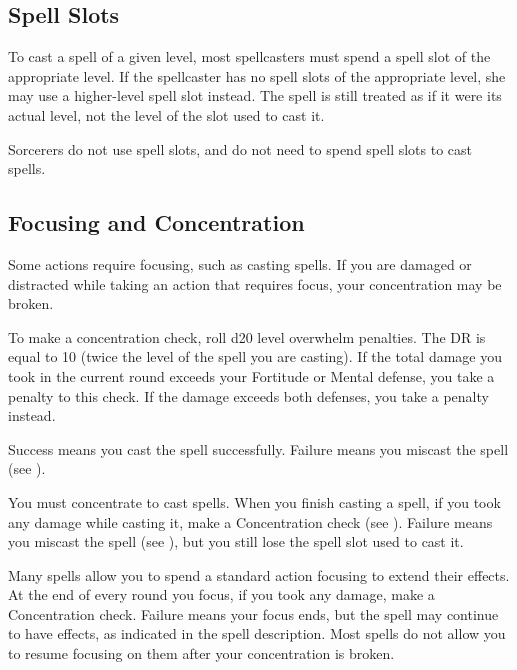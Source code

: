 \subsection{Spell Slots}
To cast a spell of a given level, most spellcasters must spend a spell slot of the appropriate level. If the spellcaster has no spell slots of the appropriate level, she may use a higher-level spell slot instead. The spell is still treated as if it were its actual level, not the level of the slot used to cast it.

Sorcerers do not use spell slots, and do not need to spend spell slots to cast spells.

\subsection{Focusing and Concentration}\label{Concentration}\label{Focus}\label{Focusing and Concentration}

Some actions require focusing, such as casting spells.
If you are damaged or distracted while taking an action that requires focus, your concentration may be broken.

\label{Concentration Checks}

To make a concentration check, roll d20 \add level \minus overwhelm penalties.
The DR is equal to 10 \add (twice the level of the spell you are casting).
If the total damage you took in the current round exceeds your Fortitude or Mental defense, you take a  penalty to this check.
If the damage exceeds both defenses, you take a  penalty instead.

Success means you cast the spell successfully.
Failure means you miscast the spell (see ).

 You must concentrate to cast spells. When you finish casting a spell, if you took any damage while casting it, make a Concentration check (see ). Failure means you miscast the spell (see ), but you still lose the spell slot used to cast it.

 Many spells allow you to spend a standard action focusing to extend their effects. At the end of every round you focus, if you took any damage, make a Concentration check. Failure means your focus ends, but the spell may continue to have effects, as indicated in the spell description. Most spells do not allow you to resume focusing on them after your concentration is broken.


